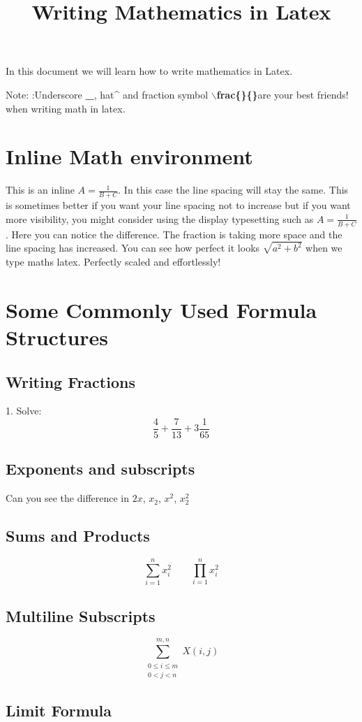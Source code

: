 \documentclass{article}
\title{Writing Mathematics in Latex}
\date{}
\author{}
\begin{document}
	\maketitle
	In this document we will learn how to write mathematics in Latex.
	
	{\large Note}: :Underscore\textbf{ \_},  hat\textbf{\^ }and fraction symbol \textbf{{$\backslash$frac\{\}\{\}}}are your best friends! when writing math in latex.
	
	\section{Inline Math environment} This is an inline $A=\frac{1}{B+C}$. In this case the line spacing will stay the same. This is sometimes better if you want your line spacing not to increase but if you want more visibility, you might consider using the display typesetting such as ${\displaystyle A=\frac{1}{B+C}}$. Here you can notice the difference. The fraction is taking more space and the line spacing has increased. You can see how perfect it looks $\sqrt{a^{2} + b^{2}}$ when we type maths latex. Perfectly scaled and effortlessly!
	
	
	\section{Some Commonly Used Formula Structures}
	\subsection{Writing Fractions}
	1. Solve:
	\[
	\frac{4}{5}+\frac{7}{13}+3\frac{1}{65}
	\]
	\subsection{Exponents and subscripts}
	Can you see the difference in $2x$, $x_2$, $x^2$, $x_2^2$
	\subsection{Sums and Products}
	\[
	\sum_{i=1}^{n} x_{i}^{2} \qquad \prod_{i=1}^{n} x_{i}^{2}
	\]
	\subsection{Multiline Subscripts}
	\[
	\sum_{\substack{
			0\le i\le m\\
			0<j<n}}^{m,n}
	X(i,j)
	\]
	
	
	
	
	\subsection{Limit Formula}
	
\end{document}
